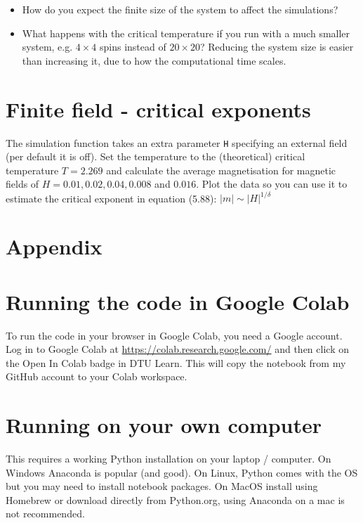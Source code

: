 \documentclass[a4paper,11pt]{article}
\begin{document}
\begin{itemize}
\item How do you expect the finite size of the system to affect the
  simulations?
 \item What happens with the critical temperature if you run with a
   much smaller system, e.g. $4\times4$ spins instead of $20\times20$?
   Reducing the system size is easier than increasing it, due to how
   the computational time scales.
\end{itemize}


\section{Finite field - critical exponents}

The simulation function takes an extra parameter \texttt{H} specifying
an external field (per default it is off).  Set the temperature to the
(theoretical) critical temperature $T=2.269$ and calculate the average
magnetisation for magnetic fields of $H = 0.01, 0.02, 0.04, 0.008$ and
$0.016$.  Plot the data so you can use it to estimate the critical
exponent in equation (5.88): $\left|m\right| \sim \left|H\right|^{1/\delta}$


\clearpage
\appendix

\section*{Appendix}

\section{Running the code in Google Colab}
\label{sec:running}

To run the code in your browser in Google Colab, you need a Google
account.  Log in to Google Colab at
\url{https://colab.research.google.com/} and then click on the Open In
Colab badge in DTU Learn.  This will copy the notebook from my GitHub
account to your Colab workspace.

\section{Running on your own computer}

This requires a working Python installation on your laptop /
computer.  On Windows Anaconda is popular (and good).  On Linux,
Python comes with the OS but you may need to install notebook
packages.  On MacOS install using Homebrew or download directly from
Python.org, using Anaconda on a mac is not recommended.
\end{document}
